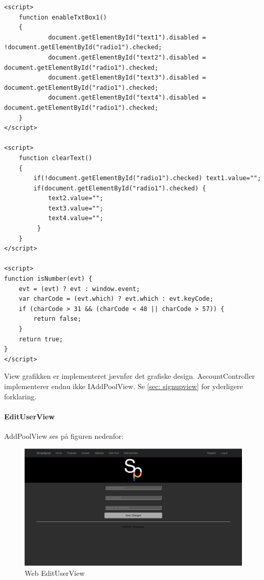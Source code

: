 \begin{lstlisting}[caption=AddPoolScripts, label=code:scripts]
 <script>
	function enableTxtBox1()
	{
         	document.getElementById("text1").disabled = !document.getElementById("radio1").checked;
         	document.getElementById("text2").disabled = document.getElementById("radio1").checked;
         	document.getElementById("text3").disabled = document.getElementById("radio1").checked;
         	document.getElementById("text4").disabled = document.getElementById("radio1").checked;
    }
</script>

<script>
	function clearText()
	{
		if(!document.getElementById("radio1").checked) text1.value="";
		if(document.getElementById("radio1").checked) {
         	text2.value="";
         	text3.value="";
         	text4.value="";
         }
    }
</script>

<script>
function isNumber(evt) {
    evt = (evt) ? evt : window.event;
    var charCode = (evt.which) ? evt.which : evt.keyCode;
    if (charCode > 31 && (charCode < 48 || charCode > 57)) {
        return false;
    }
    return true;
}
</script>

\end{lstlisting} 


View grafikken er implementeret jævnfør det grafiske design. AccountController implementerer endnu ikke IAddPoolView. Se \ref{sec: signupview} for yderligere forklaring.

\paragraph{EditUserView}
AddPoolView ses på figuren nedenfor:

\begin{figure}
	\centering
	\includegraphics[width=1.0\linewidth]{figs/implementering/web_edituserview}
	\caption{Web EditUserView}
	\label{fig:webedituserview}
\end{figure}

